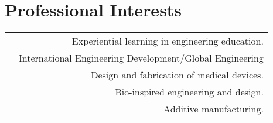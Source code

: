 \section*{Professional Interests}
\begin{tabular}{L!{\VRule}R}
&Experiential learning in engineering education.\\
&International Engineering Development/Global Engineering\\
&Design and fabrication of medical devices.\\
&Bio-inspired engineering and design.\\
&Additive manufacturing.\\
\end{tabular}